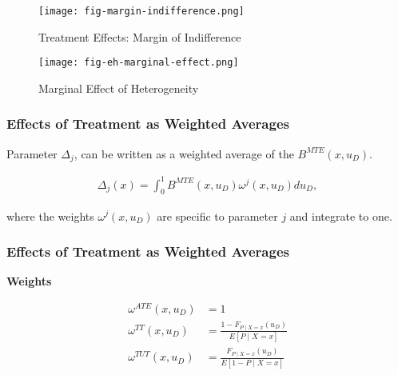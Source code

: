 \begin{frame}

\begin{figure}[htp]\centering
	\caption{Treatment Effects: Margin of Indifference}\label{Margin Indifference}\scalebox{0.35}
	{\texttt{[image: fig-margin-indifference.png]}}
\end{figure}

\end{frame}


\begin{frame}

\begin{figure}[htp]\centering
	\caption{Marginal Effect of Heterogeneity}\label{Marginal Effect of Heterogeneity}\scalebox{0.35}
	{\texttt{[image: fig-eh-marginal-effect.png]}}
\end{figure}

\end{frame}


\begin{frame}
\frametitle{Effects of Treatment as Weighted Averages}

Parameter \(\Delta_j\), can be written as a weighted average of the
\(B^{MTE}(x, u_D)\).

\begin{align*}
\Delta_j(x) = \int_0^1 B^{MTE}(x, u_D) \omega^j(x, u_D) du_D,
\end{align*}

where the weights \(\omega^j(x, u_D)\) are specific to parameter \(j\)
and integrate to one.
\end{frame}

\begin{frame}
\frametitle{Effects of Treatment as Weighted Averages}
\textbf{Weights}

\begin{align*}
 \omega^{ATE}(x, u_D) & = 1 \\
 \omega^{TT}(x, u_D) & = \frac{1 - F_{P\mid X=x}(u_D)}{E[P \mid X = x]}\\
 \omega^{TUT}(x, u_D) & = \frac{F_{P\mid X=x}(u_D)}{E[1 - P \mid X = x]}
\end{align*}

\end{frame}


